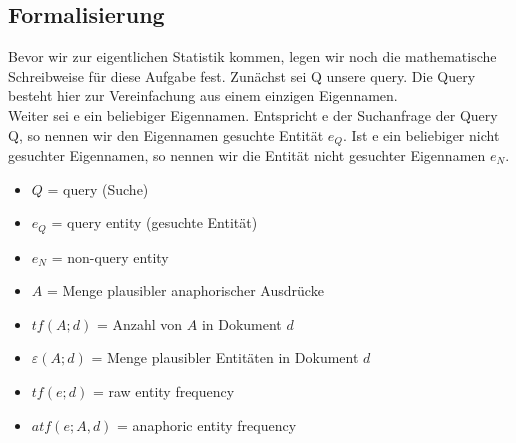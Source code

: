 \subsection{Formalisierung}
Bevor wir zur eigentlichen Statistik kommen, legen wir noch die mathematische Schreibweise für diese Aufgabe fest.
Zunächst sei Q unsere query. Die Query besteht hier zur Vereinfachung aus einem einzigen Eigennamen.\\
Weiter sei e ein beliebiger Eigennamen. Entspricht e der Suchanfrage der Query Q, so nennen wir den Eigennamen gesuchte Entität $e_Q$. Ist e ein beliebiger nicht gesuchter Eigennamen, so nennen wir die Entität nicht gesuchter Eigennamen $e_N$.\\


 \begin{itemize}
	\item $Q$ = query (Suche)
	\item $e_Q$ = query entity (gesuchte Entität)
	\item $e_N$ = non-query entity
	\item $A$ = Menge plausibler anaphorischer Ausdrücke
	\item $tf(A;d)$ = Anzahl von $A$ in Dokument $d$
	\item $\varepsilon (A;d)$ = Menge plausibler Entitäten in Dokument $d$
	\item $tf(e;d)$ = raw entity frequency
	\item $atf(e;A,d)$ = anaphoric entity frequency
  \end{itemize}
